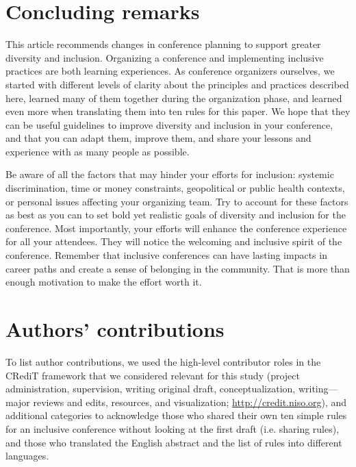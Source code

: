 \documentclass[10pt,letterpaper]{article}
\begin{document}
\section*{Concluding remarks}

This article recommends changes in conference planning to support greater diversity and inclusion. 
Organizing a conference and implementing inclusive practices are both learning experiences.
As conference organizers ourselves, we started with different levels of clarity about the principles and practices described here, learned many of them together during the organization phase, and learned even more when translating them into ten rules for this paper. 
We hope that they can be useful guidelines to improve diversity and inclusion in your conference, and that you can adapt them, improve them, and share your lessons and experience with as many people as possible. 

Be aware of all the factors that may hinder your efforts for inclusion: systemic discrimination, time or money constraints, geopolitical or public health contexts, or personal issues affecting your organizing team. 
Try to account for these factors as best as you can to set bold yet realistic goals of diversity and inclusion for the conference.
Most importantly, your efforts will enhance the conference experience for all your attendees. 
They will notice the welcoming and inclusive spirit of the conference. 
Remember that inclusive conferences can have lasting impacts in career paths and create a sense of belonging in the community.
That is more than enough motivation to make the effort worth it.


\section*{Authors' contributions}

To list author contributions, we used the high-level contributor roles in the CRediT framework that we considered relevant for this study (project administration, supervision, writing original draft, conceptualization, writing—major reviews and edits, resources, and visualization; \url{http://credit.niso.org}), and additional categories to acknowledge those who shared their own ten simple rules for an inclusive conference without looking at the first draft (i.e. sharing rules), and those who translated the English abstract and the list of rules into different languages.
\end{document}
